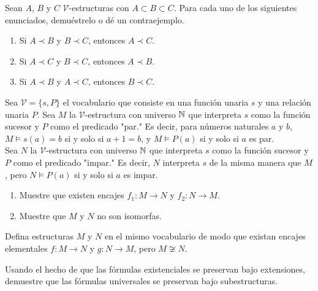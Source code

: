 \documentclass[12pt,a4paper]{book}
\newcommand{\comillas}[1]{"#1"}
\newcommand{\VV}{\mathcal{V}}
\begin{document}
    \begin{ejercicio}
        Sean $A$, $B$ y $C$ $\VV$-estructuras con $A\subset B\subset C$. Para cada uno de los siguientes enunciados,
        demuéstrelo o dé un contraejemplo.
        \begin{enumerate}[label=(\alph*)]
            \item Si $A\prec B$ y $B\prec C$, entonces $A\prec C$.
            \item Si $A\prec C$ y $B\prec C$, entonces $A\prec B$.
            \item Si $A\prec B$ y $A\prec C$, entonces $B\prec C$.
        \end{enumerate}
    \end{ejercicio}

    \begin{ejercicio}
        Sea $\VV=\{s,P\}$ el vocabulario que consiste en una función unaria $s$ y una relación unaria $P$. Sea $M$ la
        $\VV$-estructura con universo $\mathbb{N}$ que interpreta $s$ como la función sucesor y $P$ como el predicado \comillas{par.}
        Es decir, para números naturales $a$ y $b$, $M\models s(a)=b$ si y solo si $a+1=b$, y $M\models P(a)$ si y solo si
        $a$ es par.\\
        Sea $N$ la $\VV$-estructura con universo $\mathbb{N}$ que interpreta $s$ como la función sucesor y $P$ como el predicado
        \comillas{impar.} Es decir, $N$ interpreta $s$ de la misma manera que $M$, pero $N\models P(a)$ si y solo si $a$
        es impar.
        \begin{enumerate}[label=(\alph*)]
            \item Muestre que existen encajes $f_{1}:M\rightarrow N$ y $f_{2}:N\rightarrow M$.
            \item Muestre que $M$ y $N$ no son isomorfas.
        \end{enumerate}
    \end{ejercicio}

    \begin{ejercicio}
        Defina estructuras $M$ y $N$ en el mismo vocabulario de modo que existan encajes elementales $f:M\rightarrow N$ y
        $g:N\rightarrow M$, pero $M\not\cong N$.
    \end{ejercicio}

    \begin{ejercicio}\label{ej:universal-preservada-completa}
        Usando el hecho de que las fórmulas existenciales se preservan bajo extensiones, demuestre que las fórmulas
        universales se preservan bajo subestructuras.
    \end{ejercicio}
\end{document}
